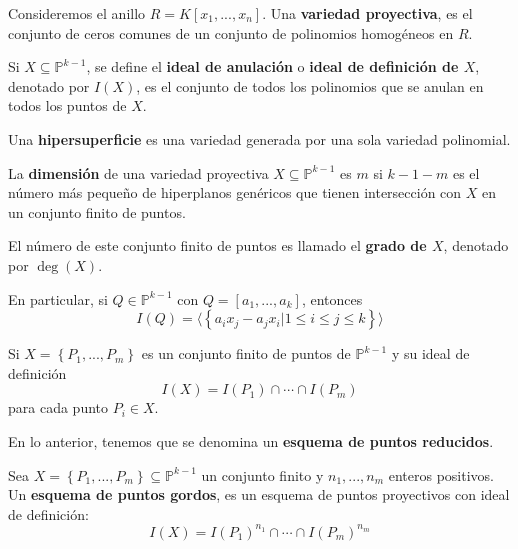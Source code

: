 \documentclass[12pt]{report}
\newcounter{it}
\theoremstyle{largebreak}
\begin{document}
    \begin{mydef}
        Consideremos el anillo $R=K[x_1,...,x_n]$. Una \textbf{variedad proyectiva}, es el conjunto de ceros comunes de un conjunto de polinomios homogéneos en $R$.

        Si $X\subseteq\mathbb{P}^{ k-1}$, se define el \textbf{ideal de anulación} o \textbf{ideal de definición de $X$}, denotado por $I(X)$, es el conjunto de todos los polinomios que se anulan en todos los puntos de $X$.
    \end{mydef}

    \begin{mydef}
        Una \textbf{hipersuperficie} es una variedad generada por una sola variedad polinomial.
    \end{mydef}

    \begin{mydef}
        La \textbf{dimensión} de una variedad proyectiva $X\subseteq\mathbb{P}^{ k-1}$ es $m$ si $k-1-m$ es el número más pequeño de hiperplanos genéricos que tienen intersección con $X$ en un conjunto finito de puntos.

        El número de este conjunto finito de puntos es llamado el \textbf{grado de $X$}, denotado por $\deg(X)$.
    \end{mydef}

    \begin{exa}
        En particular, si $Q\in\mathbb{P}^{ k-1}$ con $Q=[a_1,...,a_k]$, entonces
        \begin{equation*}
            I(Q)=\langle\left\{a_ix_j-a_jx_i\Big|1\leq i\leq j\leq k \right\} \rangle
        \end{equation*}
    \end{exa}

    Si $X=\left\{P_1,...,P_m \right\}$ es un conjunto finito de puntos de $\mathbb{P}^{ k-1}$ y su ideal de definición
    \begin{equation*}
        I(X)=I(P_1)\cap\cdots\cap I(P_m) 
    \end{equation*}
    para cada punto $P_i\in X$.

    \begin{mydef}
        En lo anterior, tenemos que se denomina un \textbf{esquema de puntos reducidos}.
    \end{mydef}

    \begin{mydef}
        Sea $X=\left\{P_1,...,P_m \right\}\subseteq\mathbb{P}^{ k-1}$ un conjunto finito y $n_1,...,n_m$ enteros positivos. Un \textbf{esquema de puntos gordos}, es un esquema de puntos proyectivos con ideal de definición:
        \begin{equation*}
            I(X)=I(P_1)^{ n_1}\cap\cdots\cap I(P_m)^{ n_m}
        \end{equation*}
    \end{mydef}
\end{document}
